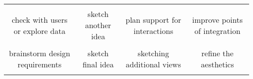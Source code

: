 {\begin{spacing}{1.0}
\begin{longtable}[]{cccc}
\begin{minipage}[t]{0.21\columnwidth}
\strut
\end{minipage}\tabularnewline
\begin{minipage}[t]{0.21\columnwidth}\raggedright\strut
check with users or explore data\strut
\end{minipage} & \begin{minipage}[t]{0.21\columnwidth}\raggedright\strut
sketch another idea\strut
\end{minipage} & \begin{minipage}[t]{0.21\columnwidth}\raggedright\strut
plan support for interactions\strut
\end{minipage} & \begin{minipage}[t]{0.21\columnwidth}\raggedright\strut
improve points of integration\strut
\end{minipage}\tabularnewline
\begin{minipage}[t]{0.21\columnwidth}\raggedright\strut
\strut
\end{minipage} & \begin{minipage}[t]{0.21\columnwidth}\raggedright\strut
\strut
\end{minipage} & \begin{minipage}[t]{0.21\columnwidth}\raggedright\strut
\strut
\end{minipage} & \begin{minipage}[t]{0.21\columnwidth}\raggedright\strut
\strut
\end{minipage}\tabularnewline
\begin{minipage}[t]{0.21\columnwidth}\raggedright\strut
brainstorm design requirements\strut
\end{minipage} & \begin{minipage}[t]{0.21\columnwidth}\raggedright\strut
sketch final idea\strut
\end{minipage} & \begin{minipage}[t]{0.21\columnwidth}\raggedright\strut
sketching additional views\strut
\end{minipage} & \begin{minipage}[t]{0.21\columnwidth}\raggedright\strut
refine the aesthetics\strut
\end{minipage}\tabularnewline
\begin{minipage}[t]{0.21\columnwidth}\raggedright\strut
\strut
\end{minipage} & \begin{minipage}[t]{0.21\columnwidth}\raggedright\strut
\strut
\end{minipage} & \begin{minipage}[t]{0.21\columnwidth}\raggedright\strut

\end{minipage}
\end{longtable}
\end{spacing}}
